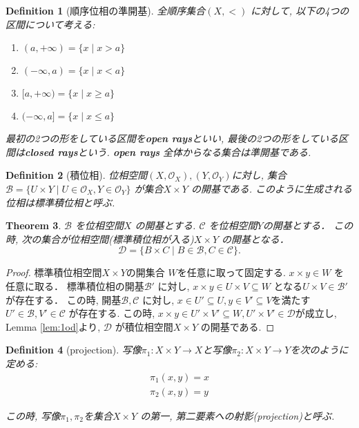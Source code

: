 \documentclass[lualatex]{ltjsbook}
\newtheorem{theorem}{Theorem}[chapter]
\newtheorem{definition}[theorem]{Definition}
\theoremstyle{remark}
\theoremstyle{plain}
\begin{document}
\begin{definition}[順序位相の準開基]
全順序集合$\left( X, < \right) $ に対して,  以下の4つの区間について考える:
	\begin{enumerate}
		\item $(a, +\infty)=\{x  \mid x>a	\}$
		\item $(-\infty ,  a)= \{ x  \mid  x< a \}$
		\item $[a, +\infty)= \{ x \mid x \ge a \}$
		\item  $(-\infty, a]= \{x  \mid x \le a \}$
	\end{enumerate}
	最初の2つの形をしている区間を\textbf{open rays}といい,  最後の2つの形をしている区間は\textbf{closed rays}という.
	\textbf{open rays} 全体からなる集合は準開基である.
\end{definition}


\begin{definition}[積位相]
	位相空間$(X, \mathcal{O}_X), (Y, \mathcal{O}_Y)$に対し,   
	集合$\mathcal{B}=\{ U \times Y  \mid U \in \mathcal{O}_X,  Y \in \mathcal{O}_Y\}$ が集合$X \times Y$ の開基である.
	このように生成される位相は標準積位相と呼ぶ.
\end{definition}

\begin{theorem}
$\mathcal{B}$ を位相空間$X$ の開基とする.
$\mathcal{C}$ を位相空間$Y$の開基とする．
この時,  次の集合が位相空間(標準積位相が入る)$X \times Y$ の開基となる．
\[
\mathcal{D}= \{B \times C  \mid B \in \mathcal{B} ,  C \in \mathcal{C} \}
.\] 
\end{theorem}

\begin{proof}
	標準積位相空間$X \times Y$の開集合 $W$を任意に取って固定する. 
	$x\times y \in W$ を任意に取る．
	標準積位相の開基$\mathcal{B'}$ に対し,  $x \times y \in U \times V \subseteq W$ となる$U \times V \in \mathcal{B'}$ が存在する．
	この時,  開基$\mathcal{B}, \mathcal{C}$ に対し,  $x \in U' \subseteq U,  y \in V' \subseteq V$を満たす $U' \in \mathcal{B}, V' \in \mathcal{C}$ が存在する.
	この時,  $x\times y \in U' \times V' \subseteq W, U' \times V' \in \mathcal{D}$が成立し,  Lemma \ref{lem:1od}より,  $\mathcal{D}$ が積位相空間$X\times Y$ の開基である.
\end{proof}


\begin{definition}[projection]
	写像$\pi_1 : X \times Y \to X$と写像$\pi_2 : X \times Y \to Y$を次のように定める:
	\[
	\begin{aligned}
		\pi_1(x, y) =x \\
		\pi_2(x, y)=y
	\end{aligned}
	\] 

	この時,  写像$\pi_1, \pi_2$を集合$X \times Y$ の第一,  第二要素への射影(projection)と呼ぶ.
\end{definition}
\end{document}
